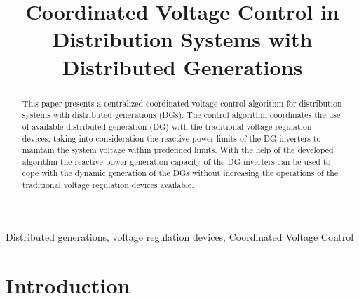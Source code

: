 \documentclass[conference]{IEEEtran}
\begin{document}
\title{Coordinated Voltage Control in Distribution
Systems with Distributed Generations}

\author{
\and
{} 
\and
{} 

}

\maketitle

\graphicspath{{figs/}}
\begin{abstract}
This paper presents a centralized coordinated voltage control algorithm for distribution systems with distributed generations (DGs).  The control algorithm coordinates the use of available distributed generation (DG) with the traditional voltage regulation devices, taking into consideration the reactive power limits of the DG inverters to maintain the system voltage within predefined limits. With the help of the developed algorithm the  reactive power generation capacity of the DG inverters can be used to cope with the dynamic generation of the DGs without increasing the operations of the traditional voltage regulation devices available.
\end{abstract}

\begin{IEEEkeywords}
Distributed generations, voltage regulation devices, Coordinated Voltage Control
\end{IEEEkeywords}

\section{Introduction}\label{sec:intro}

\end{document}
